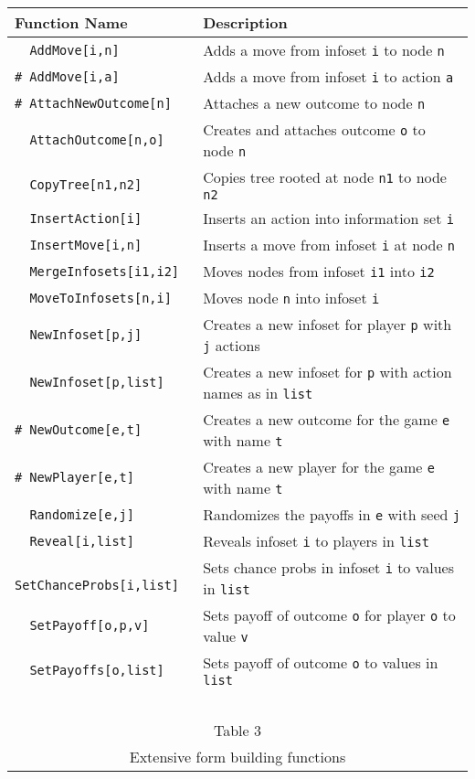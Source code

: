 \begin{table}[htp]
\begin{center}
\begin{tabular} {|l||l|} \hline
Function Name	& Description \\ 
\hline
\verb+  AddMove[i,n]+ &Adds a move from infoset \verb+i+ to node \verb+n+ \\
\verb+# AddMove[i,a]+ &Adds a move from infoset \verb+i+ to action \verb+a+ \\
\verb+# AttachNewOutcome[n]+ &Attaches a new outcome to node \verb+n+ \\
\verb+  AttachOutcome[n,o]+ &Creates and attaches outcome \verb+o+ to node \verb+n+ \\
\verb+  CopyTree[n1,n2]+ &Copies tree rooted at node \verb+n1+ to node \verb+n2+ \\
\verb+  InsertAction[i]+ &Inserts an action into information set \verb+i+ \\
\verb+  InsertMove[i,n]+ &Inserts a move from infoset \verb+i+ at node \verb+n+\\
\verb+  MergeInfosets[i1,i2]+ &Moves nodes from infoset \verb+i1+ into \verb+i2+\\
\verb+  MoveToInfosets[n,i]+ &Moves node \verb+n+ into infoset \verb+i+\\
\verb+  NewInfoset[p,j]+ &Creates a new infoset for player \verb+p+ with \verb+j+ actions\\
\verb+  NewInfoset[p,list]+ &Creates a new infoset for \verb+p+ with action names as in \verb+list+\\
\verb+# NewOutcome[e,t]+ &Creates a new outcome for the game \verb+e+
with name \verb+t+\\
\verb+# NewPlayer[e,t]+ &Creates a new player for the game \verb+e+
with name \verb+t+\\
\verb+  Randomize[e,j]+ &Randomizes the payoffs in \verb+e+ with seed \verb+j+\\
\verb+  Reveal[i,list]+ &Reveals infoset \verb+i+ to players in \verb+list+\\
\verb+  SetChanceProbs[i,list]+ &Sets chance probs in infoset \verb+i+ to values in \verb+list+\\
\verb+  SetPayoff[o,p,v]+ &Sets payoff of outcome \verb+o+ for player \verb+o+ to value \verb+v+\\
\verb+  SetPayoffs[o,list]+ &Sets payoff of outcome \verb+o+ to values in \verb+list+\\
\hline
\multicolumn{2}{c}{\ }\\
\multicolumn{2}{c}{Table 3}\\
\multicolumn{2}{c}{Extensive form building functions}\\
\end{tabular}
\end{center}
\end{table}
\medskip

